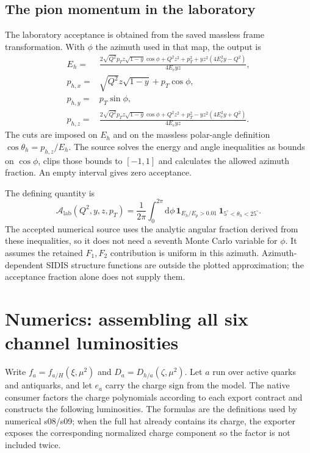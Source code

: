 \documentclass[11pt,a4paper]{article}
\newcommand{\dd}{\mathrm{d}}
\begin{document}
\subsection{The pion momentum in the laboratory}

The laboratory acceptance is obtained from the saved massless frame
transformation. With $\phi$ the azimuth used in that map, the output is
\begin{align}
 E_h={}&\frac{2\sqrt{Q^2}p_Tz\sqrt{1-y}\cos\phi+Q^2z^2+p_T^2
                    +yz^2(4E_e^2y-Q^2)}{4E_eyz},\\
 p_{h,x}={}&\sqrt{Q^2}z\sqrt{1-y}+p_T\cos\phi,\\
 p_{h,y}={}&p_T\sin\phi,\\
 p_{h,z}={}&\frac{2\sqrt{Q^2}p_Tz\sqrt{1-y}\cos\phi+Q^2z^2+p_T^2
                    -yz^2(4E_e^2y+Q^2)}{4E_eyz}.
 \label{eq:labmap}
\end{align}
The cuts are imposed on $E_h$ and on the massless polar-angle
definition $\cos\theta_h=p_{h,z}/E_h$. The source solves the energy
and angle inequalities as bounds on $\cos\phi$, clips those bounds
to $[-1,1]$ and calculates the allowed azimuth fraction. An empty
interval gives zero acceptance.

The defining quantity is
\begin{equation}
 \mathcal A_{\mathrm{lab}}(Q^2,y,z,p_T)=\frac{1}{2\pi}
 \int_0^{2\pi}\dd\phi\,
 \mathbf1_{E_h/E_p>0.01}\,
 \mathbf1_{5^\circ<\theta_h<25^\circ}.
 \label{eq:acceptance}
\end{equation}
The accepted numerical source uses the analytic angular fraction
derived from these inequalities, so it does not need a seventh Monte
Carlo variable for $\phi$. It assumes the retained $F_1,F_2$
contribution is uniform in this azimuth. Azimuth-dependent SIDIS
structure functions are outside the plotted approximation; the
acceptance fraction alone does not supply them.

\section{Numerics: assembling all six channel luminosities}
\label{sec:luminosities}

Write $f_a=f_{a/H}(\xi,\mu^2)$ and
$D_a=D_{h/a}(\zeta,\mu^2)$. Let $a$ run over active quarks and
antiquarks, and let $e_a$ carry the charge sign from the model. The
native consumer factors the charge polynomials according to each
export contract and constructs the following luminosities. The formulas
are the definitions used by numerical s08/s09; when the full hat already
contains its charge, the exporter exposes the corresponding normalized
charge component so the factor is not included twice.
\end{document}
